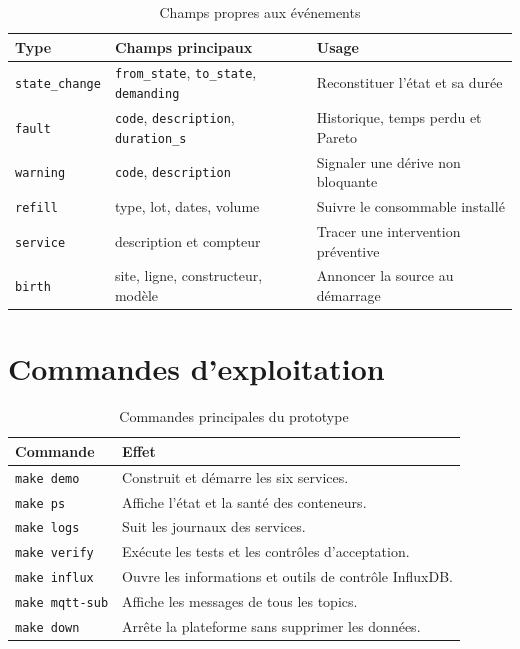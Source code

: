 \begin{table}[H]
\centering
\caption{Champs propres aux événements}
\begin{tabularx}{\textwidth}{p{}p{}Y}
\toprule
Type & Champs principaux & Usage \\
\midrule
\texttt{state\_change} & \texttt{from\_state}, \texttt{to\_state}, \texttt{demanding} &
Reconstituer l'état et sa durée \\
\texttt{fault} & \texttt{code}, \texttt{description}, \texttt{duration\_s} &
Historique, temps perdu et Pareto \\
\texttt{warning} & \texttt{code}, \texttt{description} &
Signaler une dérive non bloquante \\
\texttt{refill} & type, lot, dates, volume &
Suivre le consommable installé \\
\texttt{service} & description et compteur &
Tracer une intervention préventive \\
\texttt{birth} & site, ligne, constructeur, modèle &
Annoncer la source au démarrage \\
\bottomrule
\end{tabularx}
\end{table}

\chapter{Commandes d'exploitation}

\begin{table}[H]
\centering
\caption{Commandes principales du prototype}
\begin{tabularx}{\textwidth}{p{}Y}
\toprule
Commande & Effet \\
\midrule
\texttt{make demo} & Construit et démarre les six services. \\
\texttt{make ps} & Affiche l'état et la santé des conteneurs. \\
\texttt{make logs} & Suit les journaux des services. \\
\texttt{make verify} & Exécute les tests et les contrôles d'acceptation. \\
\texttt{make influx} & Ouvre les informations et outils de contrôle InfluxDB. \\
\texttt{make mqtt-sub} & Affiche les messages de tous les topics. \\
\texttt{make down} & Arrête la plateforme sans supprimer les données. \\
\bottomrule
\end{tabularx}
\end{table}

